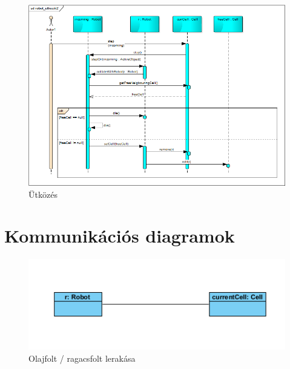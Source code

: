 \begin{figure}[!htbp]
	\begin{center}
		\includegraphics[width=18cm]{./chapters/chapter05/robot_collide.png}
		\caption{Ütközés}
	\end{center}
\end{figure}

\clearpage

\section{Kommunikációs diagramok}

\begin{figure}[!htbp]
	\begin{center}
		\includegraphics[width=13cm]{./chapters/chapter05/placetrapobject.png}
		\caption{Olajfolt / ragacsfolt lerakása}
	\end{center}
\end{figure}



